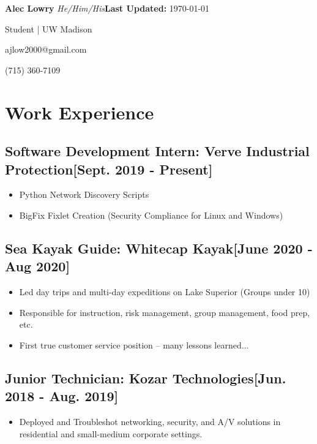 \documentclass{article}
\begin{document}
\textbf{Alec Lowry} \emph{He/Him/His}\hfill{\textbf{Last Updated:} \today}

Student | UW Madison%

ajlow2000@gmail.com

(715) 360-7109

\section{ Work Experience}

    \subsection{\textbf{Software Development Intern}: Verve Industrial Protection\hfill[Sept. 2019 - Present]}
        \begin{itemize}
            \item Python Network Discovery Scripts
            \item BigFix Fixlet Creation (Security Compliance for Linux and Windows)
        \end{itemize}

    \subsection{\textbf{Sea Kayak Guide}: Whitecap Kayak\hfill[June 2020 - Aug 2020]}
        \begin{itemize}
            \item Led day trips and multi-day expeditions on Lake Superior (Groups under 10)
            \item Responsible for instruction, risk management, group management, food prep, etc.
            \item First true customer service position -- many lessons learned...
        \end{itemize}

    \subsection{\textbf{Junior Technician}: Kozar Technologies\hfill[Jun. 2018 - Aug. 2019]}
        \begin{itemize}
            \item Deployed and Troubleshot networking, security, and A/V solutions in residential and small-medium corporate settings.
        \end{itemize}
\end{document}
